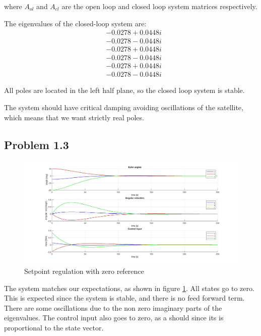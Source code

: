 where $A_{ol}$ and $A_{cl}$ are the open loop and closed loop system matrices respectively. 

The eigenvalues of the closed-loop system are:
\begin{align*}
&-0.0278 + 0.0448i \\
&-0.0278 - 0.0448i \\
&-0.0278 + 0.0448i \\
&-0.0278 - 0.0448i \\
&-0.0278 + 0.0448i \\
&-0.0278 - 0.0448i
\end{align*}

All poles are located in the left half plane, so the closed loop system is stable. 

The system should have critical damping avoiding oscillations of the satellite, which means that we want strictly real poles. 


\subsection*{Problem 1.3}

\begin{figure}
    \centering
    \includegraphics[width=1\textwidth]{figures/task1_3.jpg}
    \caption{Setpoint regulation with zero reference}
    \label{fig:task13}
\end{figure}

The system matches our expectations, as shown in figure \ref{fig:task13}. All states go to zero. This is expected since the system is stable, and there is no feed forward term. There are some oscillations due to the non zero imaginary parts of the eigenvalues. 
The control input also goes to zero, as a should since its is proportional to the state vector. 


